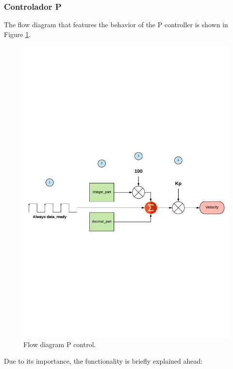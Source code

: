 \subsubsection{Controlador P} \label{sec:ControladorP}
The flow diagram that features the behavior of the P controller is shown in Figure \ref{fig:P_control}.
	\begin{figure}[H]
	\center
	\includegraphics[trim = 0cm 7cm 0mm 7cm, clip,scale=0.5]{imagenes/Balancing_robot/P.pdf}
	\caption{Flow diagram P control.}
	\label{fig:P_control}
\end{figure}

Due to its importance, the functionality is briefly explained ahead:

